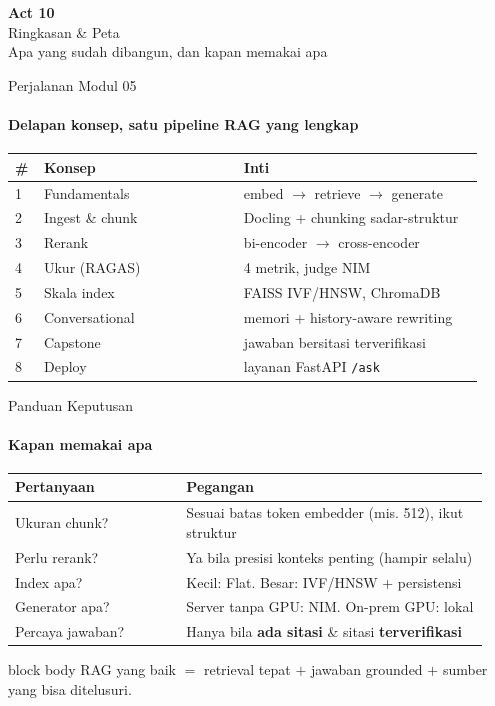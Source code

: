 \documentclass[aspectratio=169,t]{beamer}
\newcommand{\acttitle}[3]{%
  \begin{frame}[plain]
    \vspace{1.5cm}
    \begin{center}
      {\color{nvgreen}\Huge\bfseries Act #1}\\[1.2em]
      {\color{nvwhite}\Huge #2}\\[0.8em]
      {\color{nvgray}\Large #3}
    \end{center}
  \end{frame}%
}
\newcommand{\takeaway}[1]{%
  \vspace{0.3em}
  \begin{beamercolorbox}[rounded=true,shadow=false,sep=6pt]{block body}
    \centering\small\color{nvlightgreen}#1
  \end{beamercolorbox}%
}
\begin{document}
\acttitle{10}{Ringkasan \& Peta}{Apa yang sudah dibangun, dan kapan memakai apa}

\begin{frame}{Perjalanan Modul 05}
  \framesubtitle{Delapan konsep, satu pipeline RAG yang lengkap}
  \begin{center}
  \renewcommand{\arraystretch}{1.18}{\scriptsize\setlength{\tabcolsep}{5pt}
  \begin{tabular}{@{}p{0.05\linewidth}p{0.40\linewidth}p{0.48\linewidth}@{}}
    \toprule \rowcolor{nvcard!50}
    \textbf{\#} & \textbf{Konsep} & \textbf{Inti} \\ \midrule
    1 & Fundamentals & embed $\to$ retrieve $\to$ generate \\
    2 & Ingest \& chunk & Docling + chunking sadar-struktur \\
    3 & Rerank & bi-encoder $\to$ cross-encoder \\
    4 & Ukur (RAGAS) & 4 metrik, judge NIM \\
    5 & Skala index & FAISS IVF/HNSW, ChromaDB \\
    6 & Conversational & memori + history-aware rewriting \\
    7 & Capstone & jawaban bersitasi terverifikasi \\
    8 & Deploy & layanan FastAPI \texttt{/ask} \\
    \bottomrule
  \end{tabular}}
  \end{center}
\end{frame}

\begin{frame}{Panduan Keputusan}
  \framesubtitle{Kapan memakai apa}
  \begin{center}
  \renewcommand{\arraystretch}{1.3}{\footnotesize\setlength{\tabcolsep}{5pt}
  \begin{tabular}{@{}p{0.34\linewidth}p{0.60\linewidth}@{}}
    \toprule \rowcolor{nvcard!50}
    \textbf{Pertanyaan} & \textbf{Pegangan} \\ \midrule
    Ukuran chunk? & Sesuai batas token embedder (mis. 512), ikut struktur \\
    Perlu rerank? & Ya bila presisi konteks penting (hampir selalu) \\
    Index apa? & Kecil: Flat. Besar: IVF/HNSW + persistensi \\
    Generator apa? & Server tanpa GPU: NIM. On-prem GPU: lokal \\
    Percaya jawaban? & Hanya bila \textbf{ada sitasi} \& sitasi \textbf{terverifikasi} \\
    \bottomrule
  \end{tabular}}
  \end{center}
  \takeaway{RAG yang baik $=$ retrieval tepat $+$ jawaban grounded $+$ sumber yang bisa ditelusuri.}
\end{frame}
\end{document}
